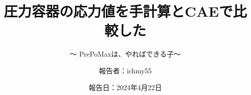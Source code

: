 %
\title{圧力容器の応力値を手計算とCAEで比較した}
\subtitle{～ PrePoMaxは、やればできる子～}
%
%
%
\date[4-22-2024]{報告日：2024年4月22日}
\author[ichmy55]{報告者：ichmy55}
\subject{Usage example of PrePoMax}
